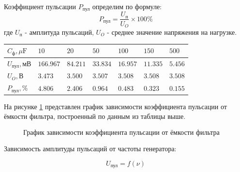 \documentclass[12pt]{article}
\begin{document}
Коэффициент пульсации $P_{\text{пул}}$ определим по формуле:
$$P_{\text{пул}} = \frac{U_{\text{п}}}{U_O}\times 100\%$$
где $U_{\text{п}}$ - амплитуда пульсаций, $U_O$ - среднее значение напряжения на нагрузке.

\begin{table}[H]
\centering
\begin{tabularx}{\textwidth}{|>{\centering\arraybackslash}X|>{\centering\arraybackslash}X|>{\centering\arraybackslash}X|>{\centering\arraybackslash}X|>{\centering\arraybackslash}X|>{\centering\arraybackslash}X|>{\centering\arraybackslash}X|}
\hline
$C_{\text{ф}}, \mu\text{F}$ & $10$ & $20$ & $50$ & $100$ & $150$ & $500$ \\
\hline
$U_{\text{пул}}, \text{мВ}$ & $166.967$ & $84.211$ & $33.834$ & $16.957$ & $11.335$ & $5.456$ \\
\hline
$U_O, \text{В}$ & $3.473$ & $3.500$ & $3.507$ & $3.508$ & $3.508$ & $3.508$ \\
\hline
$P_{\text{пул}}, \%$ & $4.806$ & $2.406$ & $0.964$ & $0.483$ & $0.323$ & $0.155$ \\
\hline
\end{tabularx}
\end{table}

\enlargethispage*{\baselineskip}

На рисунке \ref{fig:pulse_coefficient} представлен график зависимости коэффициента 
пульсации от ёмкости фильтра, построенный по данным из таблицы выше.

\begin{figure}[H]
\centering
{}
\caption{График зависимости коэффициента пульсации от ёмкости фильтра}
\label{fig:pulse_coefficient}
\end{figure}

\pagebreak

Зависимость амплитуды пульсаций от частоты генератора:

$$U_{\text{пул}} = f(\nu)$$
\end{document}
